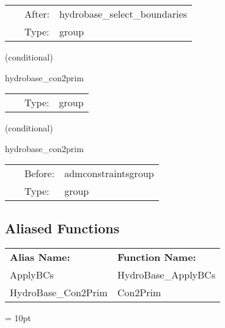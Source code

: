 \hspace{5mm}{\it apply the boundary conditions of hydrobase } 


\hspace{5mm}

 \begin{tabular*}{160mm}{cll} 
~ & After:  & hydrobase\_select\_boundaries \\ 
~ & Type:  & group \\ 
\end{tabular*} 


\vspace{5mm}

   (conditional) 

\hspace{5mm} hydrobase\_con2prim 

\hspace{5mm}{\it convert from conservative to primitive variables } 


\hspace{5mm}

 \begin{tabular*}{160mm}{cll} 
~ & Type:  & group \\ 
\end{tabular*} 


\vspace{5mm}

   (conditional) 

\hspace{5mm} hydrobase\_con2prim 

\hspace{5mm}{\it convert from conservative to primitive variables (might be redundant) } 


\hspace{5mm}

 \begin{tabular*}{160mm}{cll} 
~ & Before:  & admconstraintsgroup \\ 
~ & Type:  & group \\ 
\end{tabular*} 


\subsection*{Aliased Functions}

\hspace{5mm}

 \begin{tabular*}{160mm}{ll} 

{\bf Alias Name:} ~~~~~~~ & {\bf Function Name:} \\ 
ApplyBCs & HydroBase\_ApplyBCs \\ 
HydroBase\_Con2Prim & Con2Prim \\ 
\end{tabular*} 



\vspace{5mm}\parskip = 10pt 
